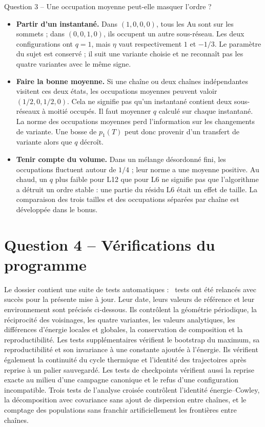 \documentclass[10pt,a4paper]{article}
\begin{document}
\begin{oral}{Question 3 -- Une occupation moyenne peut-elle masquer l'ordre ?}
\begin{itemize}
\item \textbf{Partir d'un instantané.} Dans $(1,0,0,0)$, tous les Au
sont sur les sommets ; dans $(0,0,1,0)$, ils occupent un autre sous-réseau.
Les deux configurations ont $q=1$, mais $\eta$ vaut respectivement
$1$ et $-1/3$. Le paramètre du sujet est conservé ; il suit une variante
choisie et ne reconnaît pas les quatre variantes avec le même signe.
\item \textbf{Faire la bonne moyenne.} Si une chaîne ou deux chaînes
indépendantes visitent ces deux états, les occupations moyennes peuvent
valoir $(1/2,0,1/2,0)$. Cela ne signifie pas qu'un instantané contient deux
sous-réseaux à moitié occupés. Il faut moyenner $q$ calculé sur chaque
instantané. La norme des occupations moyennes perd l'information sur
les changements de variante. Une bosse de $p_1(T)$ peut donc provenir
d'un transfert de variante alors que $q$ décroît.
\item \textbf{Tenir compte du volume.} Dans un mélange désordonné fini,
les occupations fluctuent autour de $1/4$ ; leur norme a une moyenne
positive. Au chaud, un $q$ plus faible pour L12 que pour L6 ne signifie
pas que l'algorithme a détruit un ordre stable : une partie du résidu L6
était un effet de taille. La comparaison des trois tailles et des
occupations séparées par chaîne est développée dans le bonus.
\end{itemize}
\end{oral}

\section{Question 4 -- Vérifications du programme}
Le dossier contient une suite de tests automatiques : \TestCount\ tests
ont été relancés avec succès pour la présente mise à jour. Leur date,
leurs valeurs de référence et leur environnement sont précisés ci-dessous.
Ils
contrôlent la géométrie périodique, la réciprocité des voisinages, les quatre
variantes, les valeurs analytiques, les différences d'énergie locales et
globales, la conservation de composition et la reproductibilité.
Les tests supplémentaires vérifient le bootstrap du maximum, sa
reproductibilité et son invariance à une constante ajoutée à l'énergie.
Ils vérifient également la continuité du cycle thermique et l'identité
des trajectoires après reprise à un palier sauvegardé.
Les tests de checkpoints vérifient aussi la reprise exacte au milieu
d'une campagne canonique et le refus d'une configuration incompatible.
Trois tests de l'analyse croisée contrôlent l'identité énergie--Cowley,
la décomposition avec covariance sans ajout de dispersion entre chaînes,
et le comptage des populations sans franchir artificiellement les
frontières entre chaînes.

\end{document}
